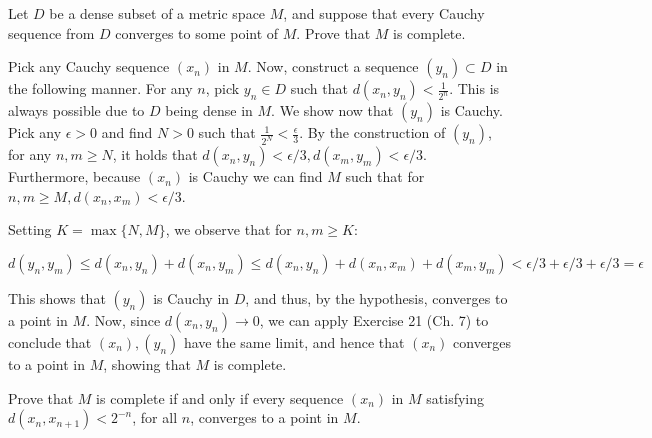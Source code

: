 \begin{exercise}{22}
    Let $D$ be a dense subset of a metric space $M$, and suppose that every Cauchy sequence from $D$ converges to some point of $M$.
    Prove that $M$ is complete.
\end{exercise}

\begin{solution}
    
    Pick any Cauchy sequence $(x_n)$ in $M$.
    Now, construct a sequence $(y_n) \subset D$ in the following manner.
    For any $n$, pick $y_n \in D$ such that $d(x_n, y_n) < \frac{1}{2^n}$.
    This is always possible due to $D$ being dense in $M$.
    We show now that $(y_n)$ is Cauchy.
    Pick any $\epsilon > 0$ and find $N > 0$ such that $\frac{1}{2^N} < \frac{\epsilon}{3}$.
    By the construction of $(y_n)$, for any $n, m \geq N$, it holds that $d(x_n, y_n) < \epsilon/3, d(x_m, y_m) < \epsilon / 3$.
    Furthermore, because $(x_n)$ is Cauchy we can find $M$ such that for $n, m \geq M, d(x_n, x_m) < \epsilon/3$.

    Setting $K = \max\{N, M\}$, we observe that for $n, m \geq K$:

    \[d(y_n, y_m) \leq d(x_n, y_n) + d(x_n, y_m) \leq d(x_n, y_n) + d(x_n, x_m) + d(x_m, y_m) < \epsilon/3 + \epsilon/3 + \epsilon/3 = \epsilon\]

    This shows that $(y_n)$ is Cauchy in $D$, and thus, by the hypothesis, converges to a point in $M$.
    Now, since $d(x_n, y_n) \rightarrow 0$, we can apply Exercise 21 (Ch. 7) to conclude that $(x_n), (y_n)$ have the same limit, and hence that $(x_n)$ converges to a point in $M$, showing that $M$ is complete.
\end{solution}

\begin{exercise}{23}
    Prove that $M$ is complete if and only if every sequence $(x_n)$ in $M$ satisfying $d(x_n, x_{n+1}) < 2^{-n}$, for all $n$, converges to a point in $M$.
\end{exercise}

